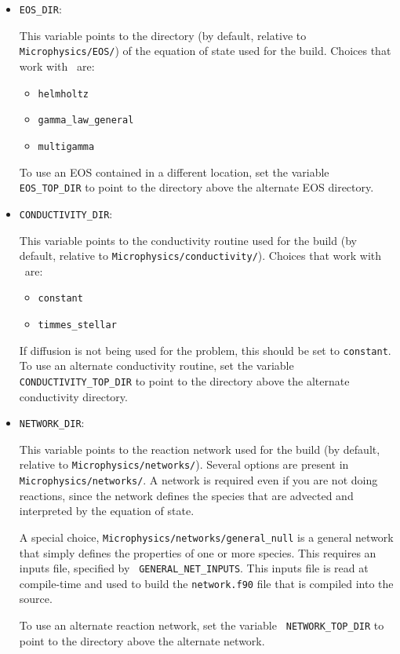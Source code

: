 \begin{itemize}
\item {\tt EOS\_DIR}:

  This variable points to the directory (by default, relative to {\tt
  Microphysics/EOS/}) of the equation of state used for the build.
  Choices that work with \maestro\ are:
  \begin{itemize}
  \item {\tt helmholtz}
  \item {\tt gamma\_law\_general}
  \item {\tt multigamma}
  \end{itemize}
  To use an EOS contained in a different location, set the variable {\tt
  EOS\_TOP\_DIR} to point to the directory above the alternate EOS
  directory.

\item {\tt CONDUCTIVITY\_DIR}:

  This variable points to the conductivity routine used for the build
  (by default, relative to {\tt Microphysics/conductivity/}).  Choices
  that work with \maestro\ are: 
  \begin{itemize} 
  \item {\tt constant} 
  \item {\tt timmes\_stellar} 
  \end{itemize} 
  If diffusion is not being used for the problem, this should be set
  to {\tt constant}.  To use an alternate conductivity
  routine, set the variable {\tt CONDUCTIVITY\_TOP\_DIR} to point
  to the directory above the alternate conductivity directory.

\item {\tt NETWORK\_DIR}:

  This variable points to the reaction network used for the build (by
  default, relative to {\tt Microphysics/networks/}).  Several options
  are present in {\tt Microphysics/networks/}.  A network is required even
  if you are not doing reactions, since the network defines the
  species that are advected and interpreted by the equation of state.

  A special choice, {\tt Microphysics/networks/general\_null} is a general
  network that simply defines the properties of one or more species.
  This requires an inputs file, specified by {\tt
  GENERAL\_NET\_INPUTS}.  This inputs file is read at compile-time and
  used to build the {\tt network.f90} file that is compiled into the
  source.

  To use an alternate reaction network, set the variable {\tt
  NETWORK\_TOP\_DIR} to point to the directory above the alternate
  network.

\end{itemize}


